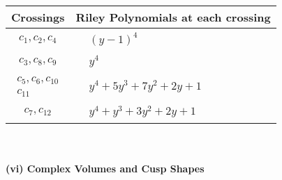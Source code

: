 \documentclass[1p]{elsarticle_modified}
\theoremstyle{definition}
\begin{document}
\begin{tabular}{m{50pt}|m{274pt}}
Crossings & \hspace{64pt}Riley Polynomials at each crossing \\
\hline $$\begin{aligned}c_{1},c_{2},c_{4}\end{aligned}$$&$\begin{aligned}
&(y-1)^4
\end{aligned}$\\
\hline $$\begin{aligned}c_{3},c_{8},c_{9}\end{aligned}$$&$\begin{aligned}
&y^4
\end{aligned}$\\
\hline $$\begin{aligned}c_{5},c_{6},c_{10}\\c_{11}\end{aligned}$$&$\begin{aligned}
&y^4+5 y^3+7 y^2+2 y+1
\end{aligned}$\\
\hline $$\begin{aligned}c_{7},c_{12}\end{aligned}$$&$\begin{aligned}
&y^4+y^3+3 y^2+2 y+1
\end{aligned}$\\
\hline
\end{tabular}\\~\\
\newpage\flushleft \textbf{(vi) Complex Volumes and Cusp Shapes}
\end{document}
